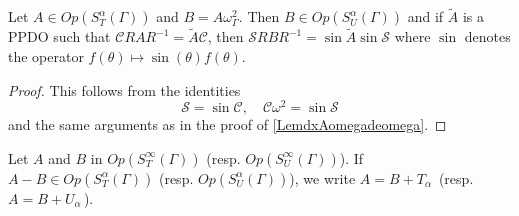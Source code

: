 \documentclass[a4paper]{article}
\begin{document}
\begin{Lem}
	Let $A \in \textit{Op}(S_T^{\alpha}(\Gamma))$ and $B = A \omega_\Gamma^2$. Then $B \in \textit{Op}(S_U^{\alpha}(\Gamma))$ and if $\tilde{A}$ is a PPDO such that $\mathcal{C}RAR^{-1} = \tilde{A} \mathcal{C}$, then $\mathcal{S}RBR^{-1} = \sin\tilde{A} \sin \mathcal{S}$ where $\sin$ denotes the operator $f(\theta) \mapsto \sin(\theta) f(\theta)$. 
	\label{LemAomega2}
\end{Lem}
\begin{proof}
	This follows from the identities
	\[\mathcal{S} = \sin \mathcal{C}, \quad \mathcal{C}\omega^2 = \sin \mathcal{S}\]
	and the same arguments as in the proof of \autoref{LemdxAomegadeomega}. 
\end{proof}
\begin{Def}
	Let $A$ and $B$ in $\textit{Op}(S^{\infty}_T(\Gamma))$ (resp. $\textit{Op}(S^{\infty}_U(\Gamma))$). If $A - B \in \textit{Op}(S^\alpha_T(\Gamma))$ (resp. $\textit{Op}(S^\alpha_U(\Gamma))$), we write 
	$A = B + T_\alpha \,$ (resp. $A = B + U_\alpha \,$). 
\end{Def}
	
\end{document}
